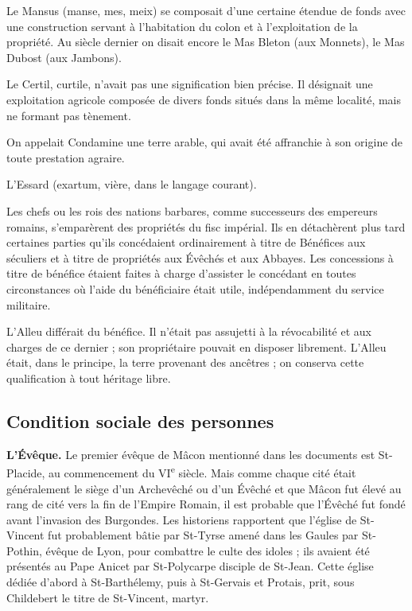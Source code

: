 \documentclass[11pt,a4paper]{report}
\begin{document}
Le Mansus (manse, mes, meix) se composait d'une certaine étendue de fonds avec
une construction servant à l'habitation du colon et à l'exploitation de la
propriété. Au siècle dernier on disait encore le Mas Bleton (aux Monnets), le Mas
Dubost (aux Jambons).

Le Certil, curtile, n'avait pas une signification bien précise. Il désignait une
exploitation agricole composée de divers fonds situés dans la même localité, mais
ne formant pas tènement.

On appelait Condamine une terre arable, qui avait été affranchie à son origine
de toute prestation agraire.

L'Essard (exartum, vière, dans le langage courant).

Les chefs ou les rois des nations barbares, comme successeurs des empereurs
romains, s'emparèrent des propriétés du fisc impérial. Ils en détachèrent plus
tard certaines parties qu'ils concédaient ordinairement à titre de Bénéfices aux
séculiers et à titre de propriétés aux Évêchés et aux Abbayes. Les concessions à
titre de bénéfice étaient faites à charge d'assister le concédant en toutes
circonstances où l'aide du bénéficiaire était utile, indépendamment du service
militaire.

L'Alleu différait du bénéfice. Il n'était pas assujetti à la révocabilité et aux
charges de ce dernier ; son propriétaire pouvait en disposer librement. L'Alleu
était, dans le principe, la terre provenant des ancêtres ; on conserva cette
qualification à tout héritage libre.

\subsection*{Condition sociale des personnes}

\textbf{L'Évêque.} Le premier évêque de Mâcon mentionné dans les documents est
St-Placide, au commencement du VI\textsuperscript{e} siècle. Mais comme chaque
cité était généralement le siège d'un Archevêché ou d'un Évêché et que Mâcon fut
élevé au rang de cité vers la fin de l'Empire Romain, il est probable que
l'Évêché fut fondé avant l'invasion des Burgondes. Les historiens rapportent que
l'église de St-Vincent fut probablement bâtie par St-Tyrse amené dans les Gaules
par St-Pothin, évêque de Lyon, pour combattre le culte des idoles ; ils avaient
été présentés au Pape Anicet par St-Polycarpe disciple de St-Jean. Cette église
dédiée d'abord à St-Barthélemy, puis à St-Gervais et Protais, prit, sous
Childebert le titre de St-Vincent, martyr.
\end{document}
